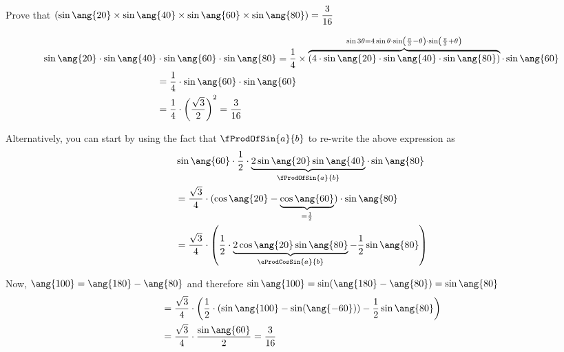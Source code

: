 


\question[4] Prove that $(\sin\ang{\vbone}\times\sin\ang{\vbtwo}\times\sin\ang{\vbthree}\times\sin\ang{\vbfour}) 
= \vbfive$

\ifprintanswers
\fi 

\begin{solution}[\halfpage]
    \begin{align}
       \sin\ang{\vbone}\cdot\sin\ang{\vbtwo}&\cdot\sin\ang{\vbthree}\cdot\sin\ang{\vbfour} = 
       \dfrac{1}{4}\times\overbrace{(4\cdot\sin\ang{\vbone}\cdot\sin\ang{\vbtwo}\cdot\sin\ang{\vbfour})}
       ^{\sin 3\theta = 4\sin\theta\cdot\sin\left( \frac{\pi}{3} - \theta\right)\cdot\sin\left(\frac{\pi}{3} +
        \theta\right)}\cdot\sin\ang{\vbthree} \\
       &= \dfrac{1}{4}\cdot\sin\ang{\vbthree}\cdot\sin\ang{\vbthree} \\
       &= \dfrac{1}{4}\cdot\left(\vbsix \right)^2 = \vbfive
    \end{align}
    
    Alternatively, you can start by using the fact that $\fProdOfSin{a}{b}$ to re-write the above expression as
    \begin{align}
    	&\sin\ang{\vbthree}\cdot\dfrac{1}{2}\cdot \underbrace{2\sin\ang{\vbone}\sin\ang{\vbtwo}}_{\fProdOfSin{a}{b}}\cdot\sin\ang{\vbfour} \\
    	&= \dfrac{\sqrt{3}}{4}\cdot(\cos\ang{\vbone}-\underbrace{\cos\ang{\vbthree}}_{= \frac{1}{2}})\cdot\sin\ang{\vbfour} \\
    	&= \dfrac{\sqrt{3}}{4}\cdot\left(\dfrac{1}{2}\cdot \underbrace{2\cos\ang{\vbone}\sin\ang{\vbfour}}
    	_{\eProdCosSin{a}{b}} - \dfrac{1}{2}\sin\ang{\vbfour}\right)
    \end{align}
    
    Now, $ \ang{\vbseven} = \ang{180}-\ang{\vbfour}$ and therefore $\sin\ang{\vbseven} =
     \sin(\ang{180}-\ang{\vbfour}) = \sin\ang{\vbfour}$
    \begin{align}
    	&= \dfrac{\sqrt{3}}{4}\cdot\left( \dfrac{1}{2}\cdot(\sin\ang{\vbseven} - \sin(\ang{-\vbthree}))
    	-\dfrac{1}{2}\sin\ang{\vbfour}\right) \\
    	&= \dfrac{\sqrt{3}}{4}\cdot\dfrac{\sin\ang{\vbthree}}{2} = \vbfive
    \end{align}
\end{solution}
